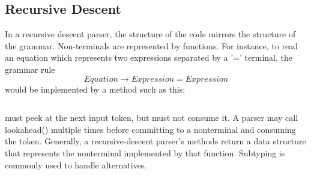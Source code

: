 \subsection{Recursive Descent}

In a recursive descent parser, the structure of the code mirrors the structure of the grammar.
Non-terminals are represented by functions.
For instance, to read an equation which represents two expressions separated by a '=' terminal,
the grammar rule
\[
    Equation \rightarrow Expression = Expression
\]
would be implemented by a method such as this:

\inputminted[fontsize=\footnotesize,linenos=true]{python}{code/parseEquation.java}

 must peek at the next input token, but must not consume it.
A parser may call lookahead() multiple times before committing to a nonterminal and
consuming the token.
Generally, a recursive-descent parser's methods return a data structure that represents the
nonterminal implemented by that function.  Subtyping is commonly used to handle alternatives.

